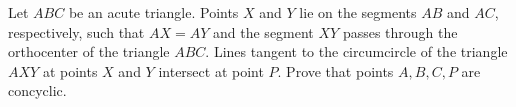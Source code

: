 Let $ABC$ be an acute triangle. Points $X$ and $Y$ lie on the segments $AB$ and $AC$, respectively, such that $AX=AY$ and the segment $XY$ passes through the orthocenter of the triangle $ABC$. Lines tangent to the circumcircle of the triangle $AXY$ at points $X$ and $Y$ intersect at point $P$. Prove that points $A, B, C, P$ are concyclic.